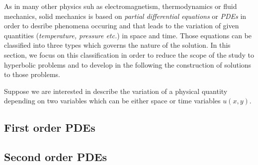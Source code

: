 As in many other physics suh as electromagnetism, thermodynamics or fluid mechanics, solid mechanics is based on \textit{partial differential equations} or \textit{PDEs} in order to desribe phenomena occuring and that leads to the variation of given quantities (\textit{temperature, pressure etc.}) in space and time. Those equations can be classified into three types which governs the nature of the solution. In this section, we focus on this classification in order to reduce the scope of the study to hyperbolic problems and to develop in the following the construction of solutions to those problems.

Suppose we are interested in describe the variation of a physical quantity depending on two variables which can be either space or time variables $u(x,y)$.
\subsection{First order PDEs}  
\subsection{Second order PDEs}  


